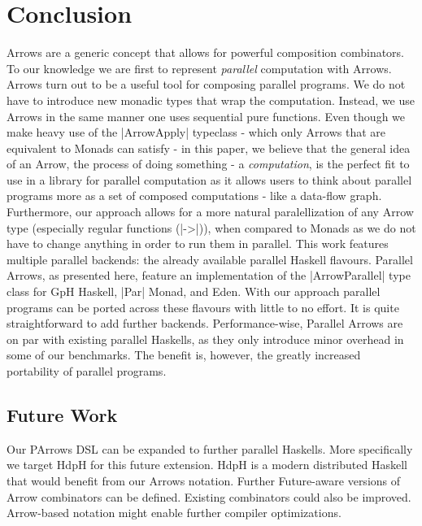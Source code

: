 
\section{Conclusion}
\label{sec:conclusion}
Arrows are a generic concept that allows for powerful composition
combinators. To our knowledge we are first to represent
\emph{parallel} computation with Arrows.
%
Arrows turn out to be a useful tool for composing parallel
programs. We do not have to introduce new monadic types that wrap the
computation. Instead, we use Arrows in the same manner one uses sequential pure functions. Even though we make heavy use of the |ArrowApply| typeclass - which only Arrows that are equivalent to Monads can satisfy - in this paper, we believe that the general idea of an Arrow, the process of doing something - a \emph{computation}, is the perfect fit to use in a library for parallel computation as it allows users to think about parallel programs more as a set of composed computations - like a data-flow graph. Furthermore, our approach allows for a more natural paralellization of any Arrow type (especially regular functions (|->|)), when compared to Monads as we do not have to change anything in order to run them in parallel.
%
This work features multiple parallel backends: the already available parallel Haskell flavours. Parallel Arrows, as presented here, feature an implementation of the |ArrowParallel| type class for GpH Haskell, |Par| Monad, and Eden. With our approach parallel programs can be ported across these flavours with little to no effort. It is quite straightforward to add further backends. 
%
%
Performance-wise, Parallel Arrows are on par with existing parallel Haskells, as they only introduce minor overhead in some of our benchmarks.
%
The benefit is, however, the greatly increased portability of parallel programs.



\subsection{Future Work}
\label{sec:future-work}

Our PArrows DSL can be expanded to further parallel Haskells. More specifically we target HdpH \cite{Maier:2014:HDS:2775050.2633363} for this future extension. HdpH is a modern distributed Haskell that would benefit from our Arrows notation. Further Future-aware versions of Arrow combinators can be defined. Existing combinators could also be improved.
Arrow-based notation might enable further compiler optimizations.

